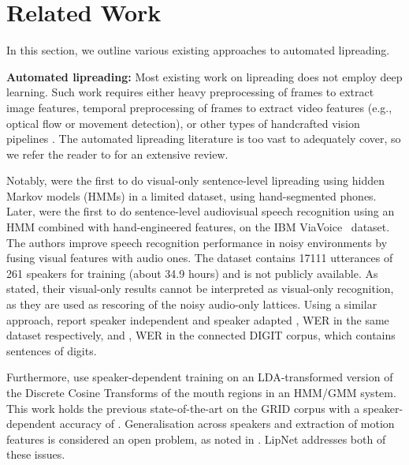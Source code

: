 \documentclass{article}
\newcommand{\minisec}[1]{\textbf{#1:}}
\begin{document}
 
\vspace{-0.6ex}
\section{Related Work}

In this section, we outline various existing approaches to automated lipreading.

\minisec{Automated lipreading} Most existing work on lipreading does not employ deep learning.  Such work requires either heavy preprocessing of frames to extract image features, temporal preprocessing of frames to extract video features (e.g., optical flow or movement detection), or other types of handcrafted vision pipelines \citep{matthews2002extraction,zhao2009lipreading,gurban2009information,papandreou2007multimodal,papandreou2009adaptive,pitsikalis2006adaptive,lucey2006patch,papandreou2009adaptive}.
The automated lipreading literature is too vast to adequately cover, so we refer the reader to \citet{zhou2014review} for an extensive review.

Notably, \citet{goldschen1997continuous} were the first to do visual-only sentence-level lipreading using hidden Markov models (HMMs) in a limited dataset, using hand-segmented phones.
Later, \citet{neti2000audio} were the first to do sentence-level audiovisual speech recognition using an HMM combined with hand-engineered features, on the IBM ViaVoice~\citep{neti2000audio} dataset. The authors improve speech recognition performance in noisy environments by fusing visual features with audio ones.
The dataset contains 17111 utterances of 261 speakers for training (about 34.9 hours) and is not publicly available. 
As stated, their visual-only results cannot be interpreted as visual-only recognition, as they are used as rescoring of the noisy audio-only lattices. Using a similar approach, \citet{potamianos2003recent} report speaker independent and speaker adapted ,  WER in the same dataset respectively, and ,  WER in the connected DIGIT corpus, which contains sentences of digits.

Furthermore, \citet{gergen2016dynamic} use speaker-dependent training on an LDA-transformed version of the Discrete Cosine Transforms of the mouth regions in an HMM/GMM system. This work holds the previous state-of-the-art on the GRID corpus with a speaker-dependent accuracy of .
Generalisation across speakers and extraction of motion features is considered an open problem, as noted in \citep{zhou2014review}.
LipNet addresses both of these issues.
\end{document}
